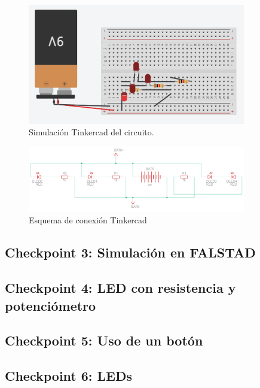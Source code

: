 \documentclass{article}
\begin{document}
\begin{figure}[H]
    \centering
    \includegraphics[width=0.85\textwidth]{./img/ckpt_2_3_1.png}
    \caption{Simulación Tinkercad del circuito.}
    \label{fig:simulacion_implementacion}
\end{figure}


\begin{figure}[H]
    \centering
    \includegraphics[width=0.85\textwidth]{./img/ckpt_2_3_2.png}
    \caption{Esquema de conexión Tinkercad}
    \label{fig:simulacion_esquema}
\end{figure}

\subsection{Checkpoint 3: Simulación en FALSTAD}

\subsection{Checkpoint 4: LED con resistencia y potenciómetro}

\subsection{Checkpoint 5: Uso de un botón}

\subsection{Checkpoint 6: LEDs}
\end{document}
